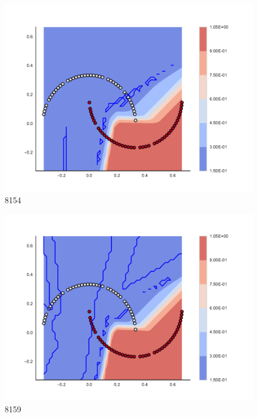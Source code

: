 \begin{subfigure}[b]{0.09\textwidth}
    \includegraphics[clip, trim=2.35cm 1.75cm 4.5cm 0cm,width=\textwidth]{img/convergence/8154.pdf}
    \caption{8154}
    \label{fig:convergence_8154}
\end{subfigure}
%
\begin{subfigure}[b]{0.09\textwidth}
    \includegraphics[clip, trim=2.35cm 1.75cm 4.5cm 0cm,width=\textwidth]{img/convergence/8159.pdf}
    \caption{8159}
    \label{fig:convergence_8159}
\end{subfigure}
%
